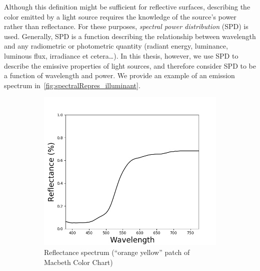 Although this definition might be sufficient for reflective surfaces, describing the color emitted by a light source requires the knowledge of the source's power rather than reflectance. For these purposes, \emph{spectral power distribution} (SPD) is used. Generally, SPD is a function describing the relationship between wavelength and any radiometric or photometric quantity (radiant energy, luminance, luminous flux, irradiance et cetera\ldots). In this thesis, however, we use SPD to describe the emissive properties of light sources, and therefore consider SPD to be a function of wavelength and power. We provide an example of an emission spectrum in~\cref{fig:spectralRepres_illuminant}.

\begin{figure}[t]
	\centering
	\begin{subfigure}[t]{0.31\textwidth}	
		\captionsetup{justification=centering}
		\includegraphics[width=\linewidth]{img/spectralRepres_reflectance.png}
		\caption{Reflectance spectrum (``orange yellow'' patch of Macbeth Color Chart)}
		\label{fig:spectralRepres_reflectance}
	\end{subfigure}
	\begin{subfigure}[t]{0.31\textwidth}
	\captionsetup{justification=centering}

\end{subfigure}
\end{figure}
